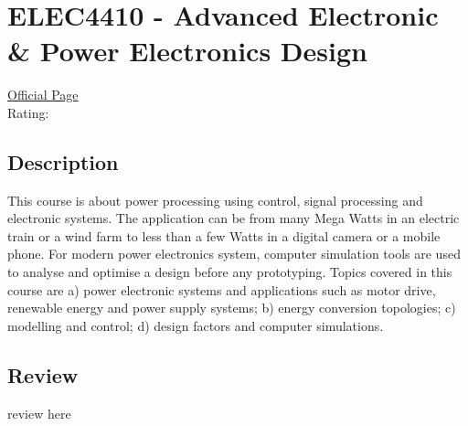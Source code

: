 \hypertarget{ELEC4410}{\section{ELEC4410 - Advanced Electronic \& Power Electronics Design}}

\large
\textcolor{turbo_purple}{\href{https://my.uq.edu.au/programs-courses/course.html?course_code=ELEC4410}{Official Page}} \\
Rating: \cstar\cstar\cstar\cstar\ostar

\normalsize
\subsection*{Description}
This course is about power processing using control, signal processing and electronic systems.
The application can be from many Mega Watts in an electric train or a wind farm to less than a few Watts in a digital camera or a mobile phone.
For modern power electronics system, computer simulation tools are used to analyse and optimise a design before any prototyping.
Topics covered in this course are a) power electronic systems and applications such as motor drive, renewable energy and power supply systems; b) energy conversion topologies; c) modelling and control; d) design factors and computer simulations.

\subsection*{Review}
review here
